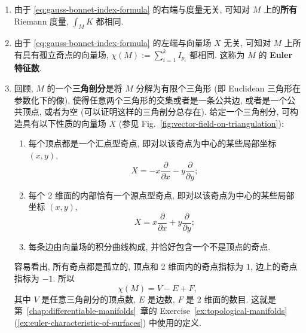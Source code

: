 \begin{RiemannRemark}\label{rem:euler-characteristic-from-indices-and-triangulation}
\begin{enumerate}[label=(\arabic*),leftmargin=*]
\item 由于 \eqref{eq:gauss-bonnet-index-formula} 的右端与度量无关, 可知对 $M$ 上的\textbf{所有} Riemann 度量, $\int_M K$ 都相同.
\item 由于 \eqref{eq:gauss-bonnet-index-formula} 的左端与向量场 $X$ 无关, 可知对 $M$ 上所有具有孤立奇点的向量场, $\chi(M):=\sum_{i=1}^k I_{p_i}$ 都相同. 这称为 $M$ 的 \textbf{Euler 特征数}.
\item 回顾, $M$ 的一个\textbf{三角剖分}是将 $M$ 分解为有限个三角形 (即 Euclidean 三角形在参数化下的像), 使得任意两个三角形的交集或者是一条公共边, 或者是一个公共顶点, 或者为空 (可以证明这样的三角剖分总存在). 给定一个三角剖分, 可构造具有以下性质的向量场 $X$ (参见 Fig.~\ref{fig:vector-field-on-triangulation}):
\begin{enumerate}[label=(\alph*),leftmargin=*]
\item 每个顶点都是一个汇点型奇点, 即对以该奇点为中心的某些局部坐标 $(x,y)$,
\[
  X=-x\frac{\partial}{\partial x}-y\frac{\partial}{\partial y};
\]
\item 每个 2 维面的内部恰有一个源点型奇点, 即对以该奇点为中心的某些局部坐标 $(x,y)$,
\[
  X=x\frac{\partial}{\partial x}+y\frac{\partial}{\partial y};
\]
\item 每条边由向量场的积分曲线构成, 并恰好包含一个不是顶点的奇点.
\end{enumerate}
容易看出, 所有奇点都是孤立的, 顶点和 2 维面内的奇点指标为 $1$, 边上的奇点指标为 $-1$. 所以
\[
  \chi(M)=V-E+F,
\]
其中 $V$ 是任意三角剖分的顶点数, $E$ 是边数, $F$ 是 2 维面的数目. 这就是第~\ref{chap:differentiable-manifolds}~章的 Exercise~\ref{ex:topological-manifolds}(\ref{ex:euler-characteristic-of-surfaces}) 中使用的定义.
\end{enumerate}
\end{RiemannRemark}

